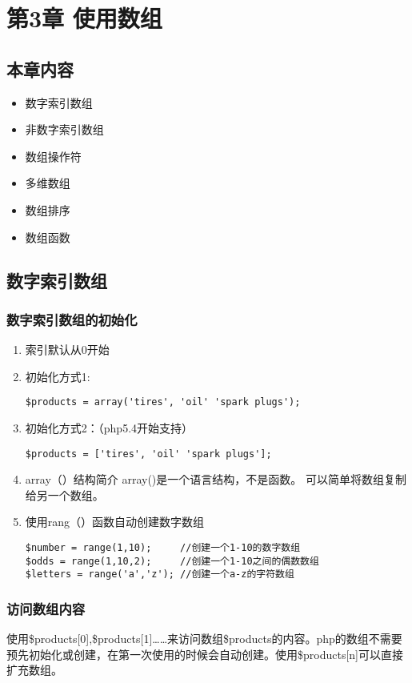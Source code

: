 \documentclass[11pt]{article}
\begin{document}
\section{第3章 使用数组}
\label{sec:orgfecfb8d}
\subsection{本章内容}
\label{sec:orga460e69}
\begin{itemize}
\item 数字索引数组
\item 非数字索引数组
\item 数组操作符
\item 多维数组
\item 数组排序
\item 数组函数
\end{itemize}
\subsection{数字索引数组}
\label{sec:org9070f16}
\subsubsection{数字索引数组的初始化}
\label{sec:org4fa23fc}
\begin{enumerate}
\item 索引默认从0开始
\label{sec:org7acf19f}
\item 初始化方式1:
\label{sec:orgb241a38}
\begin{verbatim}
$products = array('tires', 'oil' 'spark plugs');
\end{verbatim}
\item 初始化方式2：（php5.4开始支持）
\label{sec:orgb586bed}
\begin{verbatim}
$products = ['tires', 'oil' 'spark plugs'];
\end{verbatim}
\item array（）结构简介
\label{sec:org8be2e8a}
array()是一个语言结构，不是函数。  可以简单将数组复制给另一个数组。
\item 使用rang（）函数自动创建数字数组
\label{sec:orga374212}
\begin{verbatim}
$number = range(1,10);     //创建一个1-10的数字数组
$odds = range(1,10,2);     //创建一个1-10之间的偶数数组
$letters = range('a','z'); //创建一个a-z的字符数组
\end{verbatim}
\end{enumerate}
\subsubsection{访问数组内容}
\label{sec:org47af920}
使用\$products[0],\$products[1]……来访问数组\$products的内容。php的数组不需要预先初始化或创建，在第一次使用的时候会自动创建。使用\$products[n]可以直接扩充数组。
\end{document}
